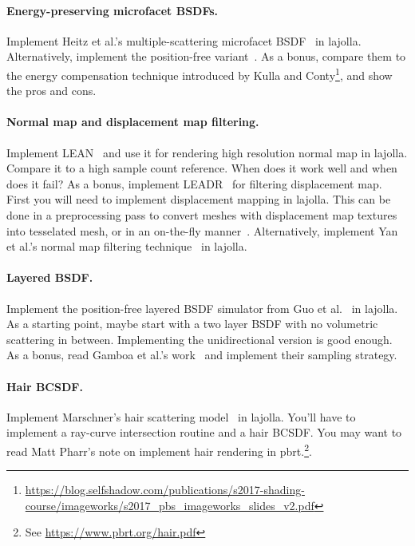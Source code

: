 \paragraph{Energy-preserving microfacet BSDFs.} 
Implement Heitz et al.'s multiple-scattering microfacet BSDF~\cite{Heitz:2016:MMB} in lajolla.
Alternatively, implement the position-free variant~\cite{Wang:2022:PMC}.
As a bonus, compare them to the energy compensation technique introduced by Kulla and Conty\footnote{\url{https://blog.selfshadow.com/publications/s2017-shading-course/imageworks/s2017_pbs_imageworks_slides_v2.pdf}}, and show the pros and cons.

\paragraph{Normal map and displacement map filtering.}
Implement LEAN~\cite{Olano:2010:LM} and use it for rendering high resolution normal map in lajolla.
Compare it to a high sample count reference.
When does it work well and when does it fail?
As a bonus, implement LEADR~\cite{Dupuy:2013:LEA} for filtering displacement map.
First you will need to implement displacement mapping in lajolla.
This can be done in a preprocessing pass to convert meshes with displacement map textures into tesselated mesh, or in an on-the-fly manner~\cite{Thonat:2021:TDM}.
Alternatively, implement Yan et al.'s normal map filtering technique~\cite{Yan:2014:RGH} in lajolla. 

\paragraph{Layered BSDF.}
Implement the position-free layered BSDF simulator from Guo et al.~\cite{Guo:2018:PMC} in lajolla.
As a starting point, maybe start with a two layer BSDF with no volumetric scattering in between.
Implementing the unidirectional version is good enough.
As a bonus, read Gamboa et al.'s work~\cite{Gamboa:2020:ETE} and implement their sampling strategy.

\paragraph{Hair BCSDF.}
Implement Marschner's hair scattering model~\cite{Marschner:2003:LSH} in lajolla.
You'll have to implement a ray-curve intersection routine and a hair BCSDF.
You may want to read Matt Pharr's note on implement hair rendering in pbrt.\footnote{See \url{https://www.pbrt.org/hair.pdf}}. 

